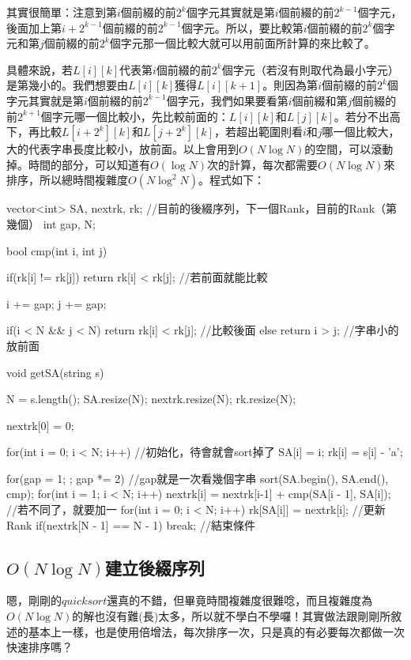 \documentclass[main.tex]{subfiles}
\begin{document}
			其實很簡單：注意到第$i$個前綴的前$2^{k}$個字元其實就是第$i$個前綴的前$2^{k - 1}$個字元，後面加上第$i + 2^{k - 1}$個前綴的前$2^{k - 1}$個字元。所以，要比較第$i$個前綴的前$2^{k}$個字元和第$j$個前綴的前$2^{k}$個字元那一個比較大就可以用前面所計算的來比較了。
			
			
			具體來說，若$L[i][k]$代表第$i$個前綴的前$2^{k}
			$個字元（若沒有則取代為最小字元）是第幾小的。我們想要由$L[i][k]$獲得$L[i][k + 1]$。則因為第$i$個前綴的前$2^{k}$個字元其實就是第$i$個前綴的前$2^{k - 1}$個字元，我們如果要看第$i$個前綴和第$j$個前綴的前$2^{k + 1}$個字元哪一個比較小，先比較前面的：$L[i][k]$和$L[j][k]$。若分不出高下，再比較$L[i + 2^{k}][k]$和$L[j + 2^{k}][k]$，若超出範圍則看$i$和$j$哪一個比較大，大的代表字串長度比較小，放前面。以上會用到$O(N \log N)$的空間，可以滾動掉。時間的部分，可以知道有$O(\log N)$次的計算，每次都需要$O(N \log N)$來排序，所以總時間複雜度$O(N \log^2 N)$。程式如下：
			\begin{C++}
vector<int> SA, nextrk, rk; //目前的後綴序列，下一個Rank，目前的Rank（第幾個）
int gap, N;

bool cmp(int i, int j){
	if(rk[i] != rk[j]) 
		return rk[i] < rk[j]; //若前面就能比較
	
	i += gap;
	j += gap;
	
	if(i < N && j < N) 
		return rk[i] < rk[j]; //比較後面
	else 
		return i > j; //字串小的放前面
}

void getSA(string s){
	N = s.length();
	SA.resize(N);
	nextrk.resize(N);
	rk.resize(N);
	
	nextrk[0] = 0;
	
	for(int i = 0; i < N; i++){ //初始化，待會就會sort掉了
		SA[i] = i;
		rk[i] = s[i] - 'a';
	}
	
	for(gap = 1; ; gap *= 2){ //gap就是一次看幾個字串
		sort(SA.begin(), SA.end(), cmp);
		for(int i = 1; i < N; i++) 
			nextrk[i] = nextrk[i-1] + cmp(SA[i - 1], SA[i]); //若不同了，就要加一
		for(int i = 0; i < N; i++) 
			rk[SA[i]] = nextrk[i]; //更新Rank
		if(nextrk[N - 1] == N - 1) break; //結束條件
	}
}
			\end{C++}		
		\subsection{$O(N \log N)$建立後綴序列}
		嗯，剛剛的$quick sort$還真的不錯，但畢竟時間複雜度很難唸，而且複雜度為$O(N \log N)$的解也沒有難(長)太多，所以就不學白不學囉！其實做法跟剛剛所敘述的基本上一樣，也是使用倍增法，每次排序一次，只是真的有必要每次都做一次快速排序嗎？
		
\end{document}
